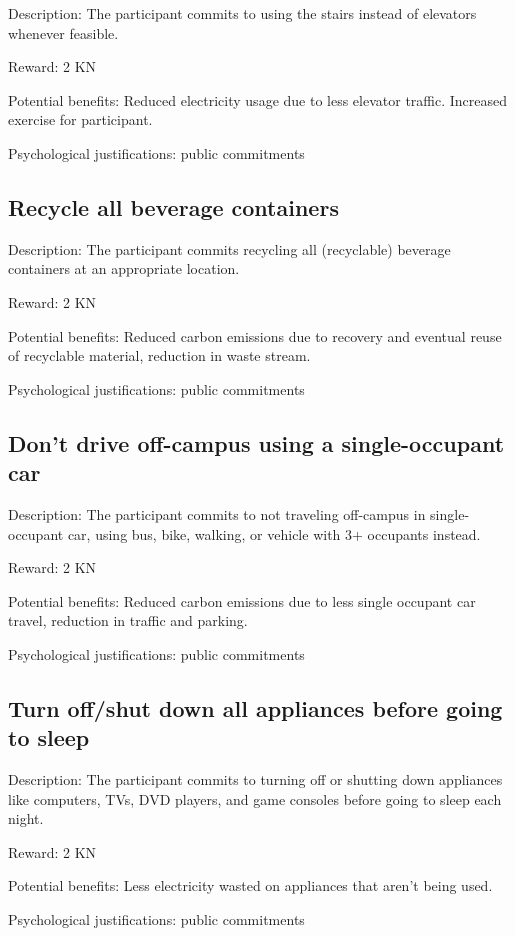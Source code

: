 Description: The participant commits to using the stairs instead of elevators whenever feasible.

Reward: 2 KN

Potential benefits: Reduced electricity usage due to less elevator traffic. Increased exercise for participant.

Psychological justifications: public commitments

\subsection{Recycle all beverage containers}

Description: The participant commits recycling all (recyclable) beverage containers at an appropriate location.

Reward: 2 KN

Potential benefits: Reduced carbon emissions due to recovery and eventual reuse of recyclable material, reduction in waste stream.

Psychological justifications: public commitments

\subsection{Don't drive off-campus using a single-occupant car}

Description: The participant commits to not traveling off-campus in single-occupant car, using bus, bike, walking, or vehicle with 3+ occupants instead.

Reward: 2 KN

Potential benefits: Reduced carbon emissions due to less single occupant car travel, reduction in traffic and parking.

Psychological justifications: public commitments

\subsection{Turn off/shut down all appliances before going to sleep}

Description: The participant commits to turning off or shutting down appliances like computers, TVs, DVD players, and game consoles before going to sleep each night.

Reward: 2 KN

Potential benefits: Less electricity wasted on appliances that aren't being used.

Psychological justifications: public commitments

